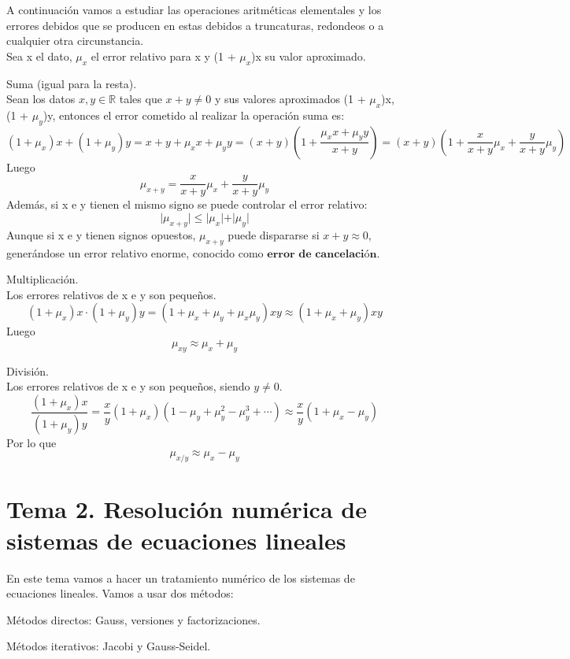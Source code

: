 A continuación vamos a estudiar las operaciones aritméticas elementales y los errores debidos que se producen en estas debidos a truncaturas, redondeos o a cualquier otra circunstancia.\\
Sea x el dato, $\mu _x$ el error relativo para x y (1 + $\mu _x$)x su valor aproximado.
	\begin{nlist}
	\item Suma (igual para la resta).\\
	Sean los datos $x, y \in \mathbb{R}$ tales que $x + y \neq 0$ y sus valores aproximados (1 + $\mu _x$)x, (1 + $\mu _y$)y, entonces el error cometido al realizar la operación suma es:
	\[ (1 + \mu _x)x + (1 + \mu _y)y = x + y + \mu _xx + \mu _yy = (x+y) \left( 1 + \frac{\mu _xx + \mu _yy}{x+y} \right) = (x+y) \left( 1 + \frac{x}{x+y} \mu _x + \frac{y}{x+y} \mu _y \right)  \]
	Luego
	\[ \mu _{x+y} = \frac{x}{x+y} \mu _x + \frac{y}{x+y} \mu _y \]
	Además, si x e y tienen el mismo signo se puede controlar el error relativo:
	\[ \vert \mu _{x+y} \vert \leq \vert \mu _x \vert + \vert \mu _y \vert \]
	Aunque si x e y tienen signos opuestos, $\mu _{x+y}$ puede dispararse si $x + y \approx 0$, generándose un error relativo enorme, conocido como $\textbf{error de cancelación}$.
	\item Multiplicación.\\
	Los errores relativos de x e y son pequeños.
	\[ (1 + \mu _x)x \cdot (1 + \mu _y)y = (1 + \mu _x + \mu _y + \mu _x \mu _y)xy \approx (1 + \mu _x + \mu _y)xy \]
	Luego
	\[ \mu _{xy} \approx \mu _x + \mu _y \]
	\item División.\\
	Los errores relativos de x e y son pequeños, siendo $y \neq 0$.
	\[ \frac{(1 + \mu _x)x}{(1 + \mu _y)y} = \frac{x}{y}(1 + \mu _x)(1 - \mu _y + \mu _y^2 - \mu _y^3 + \cdots) \approx \frac{x}{y}(1 + \mu _x - \mu _y) \]
	Por lo que
	\[ \mu _{x/y} \approx \mu _x - \mu _y \]
	\end{nlist}


\part{Tema 2. Resolución numérica de sistemas de ecuaciones lineales}
En este tema vamos a hacer un tratamiento numérico de los sistemas de ecuaciones lineales. Vamos a usar dos métodos:
	\begin{nlist}
	\item Métodos directos: Gauss, versiones y factorizaciones.
	\item Métodos iterativos: Jacobi y Gauss-Seidel.
	\end{nlist}

